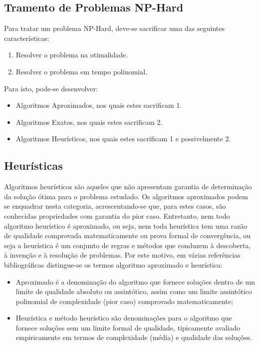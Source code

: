 \documentclass[a4paper, 12pt]{article}
\begin{document}

\subsection{Tramento de Problemas NP-Hard} \label{nphard}

Para tratar um problema NP-Hard, deve-se sacrificar uma das seguintes características:
\begin{enumerate}
    \item Resolver o problema na otimalidade.
    \item Resolver o problema em tempo polinomial.
\end{enumerate}
Para isto, pode-se desenvolver:
\begin{itemize}
    \item Algoritmos Aproximados, nos quais estes sacrificam 1.
    \item Algoritmos Exatos, nos quais estes sacrificam 2.
    \item Algoritmos Heurísticos, nos quais estes sacrificam 1 e possivelmente 2.
\end{itemize}

\subsection{Heurísticas}

Algoritmos heurísticos são aqueles que não apresentam garantia de determinação da solução ótima para o 
problema estudado. Os algoritmos aproximados podem se enquadrar nesta categoria, acrescentando-se que, para 
estes casos, são conhecidas propriedades com garantia do pior caso.  Entretanto, nem todo algoritmo heurístico 
é aproximado, ou seja, nem toda heurística tem uma razão de qualidade comprovada matematicamente ou prova 
formal de convergência, ou seja a heurística é um conjunto de regras e métodos que conduzem à descoberta, à 
invenção e à resolução de problemas. Por este motivo, em várias referências bibliográficas distingue-se os 
termos algoritmo aproximado e heurística:
\begin{itemize}
    \item Aproximado é a denominação do algoritmo que fornece soluções dentro de um limite de qualidade absoluto ou assintótico, assim como um limite assintótico polinomial de complexidade (pior caso) comprovado matematicamente;
    \item Heurística e método heurístico são denominações para o algoritmo que fornece soluções sem um limite formal de qualidade, tipicamente avaliado empiricamente em termos de complexidade (média) e qualidade das soluções.
\end{itemize}
\end{document}
